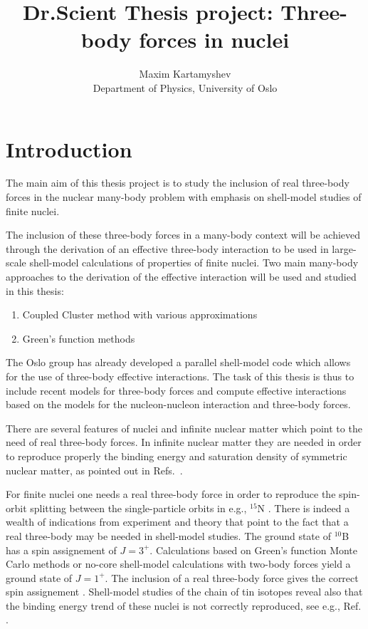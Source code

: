 \documentclass{article}
\begin{document}
\title{Dr.Scient Thesis project: Three-body forces in nuclei}

\author{Maxim Kartamyshev\\ 
        Department of Physics, University of Oslo} 

\maketitle  



\section{Introduction}

The main aim of 
this thesis project is to study the inclusion of real three-body forces
in the nuclear many-body problem with emphasis on shell-model studies
of finite nuclei.

The inclusion of 
these three-body forces in a many-body context will be achieved through
the derivation of an effective three-body interaction to be used
in large-scale shell-model calculations of properties of finite 
nuclei. Two main many-body approaches to the derivation of the effective interaction will
be used and studied in this thesis:
\begin{enumerate}
\item Coupled Cluster method with various approximations
\item Green's function methods
\end{enumerate}

The Oslo group has already developed a parallel shell-model code
which allows for the use of three-body effective interactions.
The task of this thesis is thus to include recent models for three-body 
forces and compute effective interactions based on the models for the 
nucleon-nucleon interaction and three-body forces. 

There are several features of nuclei and infinite nuclear matter which
point to the need of real three-body forces.
In infinite nuclear matter they are needed in order to reproduce properly
the binding energy and saturation density of symmetric nuclear matter,
as pointed out in Refs.~\cite{vijay98,hh2000}. 

For finite nuclei one  needs a real three-body force in order to reproduce
the spin-orbit splitting between the single-particle orbits in e.g., $^{15}$N
\cite{vijay92}. There is indeed a wealth of indications from experiment and theory   
that point to the fact that a real three-body may be needed in shell-model studies. The ground state of $^{10}$B has a spin assignement of $J=3^+$.
Calculations based on Green's function Monte Carlo methods or no-core
shell-model calculations with two-body forces yield a ground state of
$J=1^+$. The inclusion of a real three-body force gives the correct
spin assignement \cite{erich2002}. 
Shell-model studies of the chain of tin isotopes reveal also that
the binding energy trend of these nuclei is not correctly 
reproduced, see e.g., Ref. \cite{anne98}.
\end{document}
